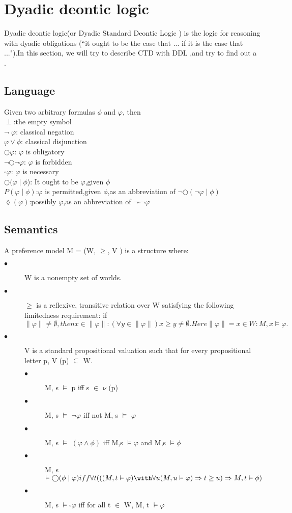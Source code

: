 \documentclass{article}
\begin{document}
\section{Dyadic deontic logic}
Dyadic deontic logic(or Dyadic Standard Deontic Logic ) is the logic for reasoning with dyadic obligations (“it ought to be the case that ... if it is the case that ...").In this section, we will try to describe CTD with DDL ,and try to find out a .
\subsection{Language}
Given two arbitrary formulas $\phi$  and $\varphi$, then\\
$\perp$:the empty symbol\\
$\neg$ $\varphi$: classical negation\\
$\varphi \vee  \phi $: classical disjunction\\
$\bigcirc \varphi $: $\varphi$ is obligatory\\
$ \neg \bigcirc\neg\varphi$: $ \varphi$ is forbidden\\
$ \square\varphi$: $\varphi$ is necessary\\
$\bigcirc(\varphi\mid\phi$): It ought to be $\varphi$,given $\phi$\\
$P(\varphi\mid\phi) $:$\varphi$ is permitted,given $\phi$,as an abbreviation of $\neg\bigcirc(\neg\varphi\mid\phi)$\\
$\lozenge(\varphi)$:possibly $\varphi$,as an abbreviation of $\neg\square\neg\varphi$
\subsection{Semantics}
A preference model M = (W, $\geq$, V ) is a structure where:
\begin{description}
\item[$\bullet$ ] W is a nonempty set of worlds.
\item[$\bullet $] $ \geq$ is a reflexive, transitive relation over W satisfying the following limitedness requirement: if $\|\varphi\| \neq \emptyset, then {x\in\|\varphi\| : (\forall y \in \|\varphi\|)x\geq y} \neq \emptyset. Here\|\varphi\| = {x \in W : M, x\vDash \varphi}.$
\item[$\bullet$]V is a standard propositional valuation such that for every propositional letter p, V (p) $\subseteq$ W.
\begin{description}
\item[$\bullet$ ]M, s $ \vDash $ p iff s $\in$ $\nu$  (p)
\item[$\bullet$ ]M, s $ \vDash $ $\neg \varphi$ iff not M, s $ \vDash $ $\varphi$
\item[$\bullet$ ]M, s $ \vDash $ $(\varphi\land\phi )$ iff M,s $ \vDash \varphi$ and  M,s $ \vDash \phi$
\item[$\bullet$ ]M, s $ \vDash  \bigcirc(\phi\mid\varphi) iff \forall t(((M, t \vDash \varphi)\with\forall u(M, u \vDash \varphi) \Rightarrow t \geq u) \Rightarrow M, t \vDash \phi)$
\item[$\bullet$ ]M, s $ \vDash  \square\varphi$ iff for all t $\in$ W, M, t $\vDash \varphi$
\end{description}
\end{description}
\end{document}

